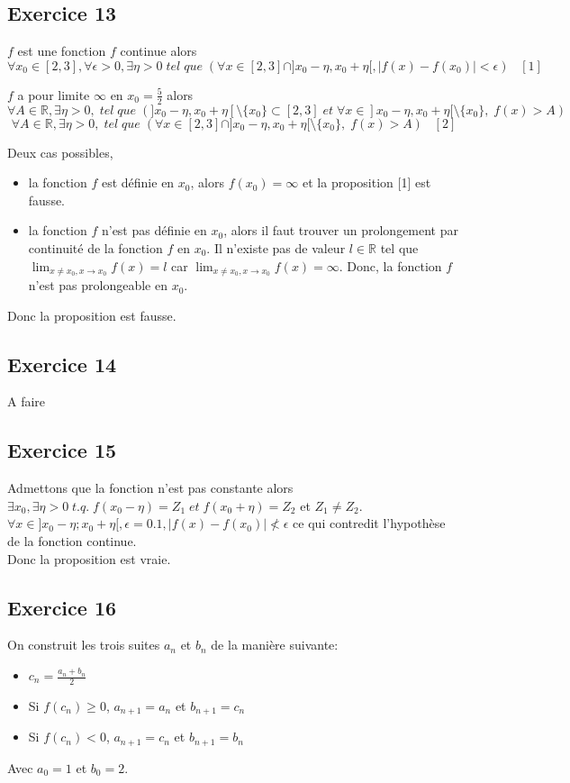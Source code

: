 \documentclass[]{book}
\theoremstyle{definition}
\newcommand{\bb}[1]{\mathbb{#1}}
\newcommand{\R}{\bb{R}}
\begin{document}
\subsection*{Exercice 13}
$f$ est une fonction $f$ continue alors 
$$\forall x_0 \in [2,3], \forall \epsilon >0, \exists \eta > 0\; tel\; que\; (\forall x \in [2,3] \cap ]x_0-\eta, x_0+\eta[, |f(x)-f(x_0)| < \epsilon) \;\;\; [1]$$ 

$f$ a pour limite $\infty$ en $x_0=\frac{5}{2}$ alors
$$\forall A \in \R, \exists \eta > 0,\; tel\; que\; (]x_0-\eta, x_0+\eta[ \setminus \{x_0\} \subset [2,3] \; et \; \forall x \in ]x_0-\eta, x_0+\eta[ \setminus \{x_0\},\; f(x) > A)$$
$$\forall A \in \R, \exists \eta > 0,\; tel\; que\; (\forall x \in [2,3] \cap ]x_0-\eta, x_0+\eta[ \setminus \{x_0\}, \; f(x) > A) \;\;\; [2]$$

Deux cas possibles, 
\begin{itemize}
\item la fonction $f$ est d\'efinie en $x_0$, alors $f(x_0) = \infty$ et la proposition [1] est fausse.
\item la fonction $f$ n'est pas d\'efinie en $x_0$, alors il faut trouver un prolongement par continuit\'e de la fonction $f$ en $x_0$. Il n'existe pas de valeur $l \in \R$ tel que $\lim_{x \neq x_0, x \to x_0} f(x) = l$ car $\lim_{x \neq x_0, x \to x_0} f(x) = \infty$. Donc,  la fonction $f$ n'est pas prolongeable en $x_0$.
\end{itemize}


Donc la proposition est fausse.


\subsection*{Exercice 14}
A faire

\subsection*{Exercice 15}
Admettons que la fonction n'est pas constante alors $\exists x_0, \exists \eta > 0\; t.q.\; f(x_0 - \eta) = Z_1\; et \; f(x_0 + \eta) = Z_2$ et $Z_1 \neq Z_2$.\\


$\forall x \in ]x_0 - \eta;x_0 + \eta[, \epsilon = 0.1, |f(x) - f(x_0)| \nless \epsilon$ ce qui contredit l'hypoth\`ese de la fonction continue.\\

Donc la proposition est vraie.

\subsection*{Exercice 16}
On construit les trois suites $a_n$ et $b_n$ de la mani\`ere suivante:
\begin{itemize}
\item $c_n = \frac{a_n + b_n}{2}$
\item Si $f(c_n) \ge 0$, $a_{n+1} = a_n$ et $b_{n+1} = c_n$
\item Si $f(c_n) < 0$, $a_{n+1} = c_n$ et $b_{n+1} = b_n$
\end{itemize}
Avec $a_0 = 1$ et $b_0 = 2$.\\
\end{document}
